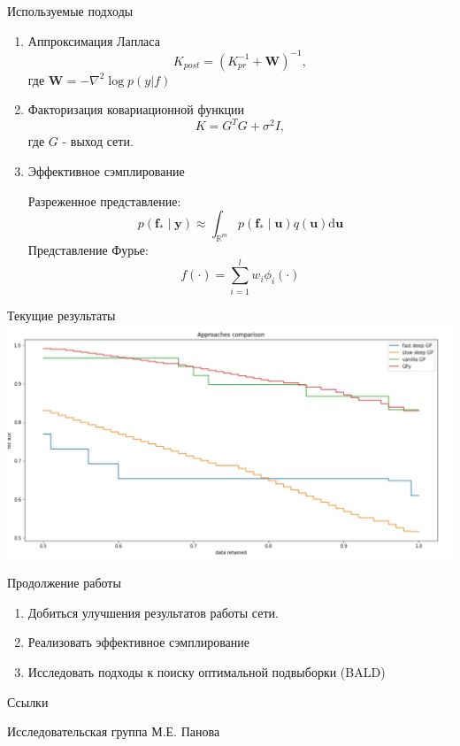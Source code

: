 \documentclass[9pt,pdf,hyperref={unicode}]{beamer}
\begin{document}
\begin{frame}{Используемые подходы}
\begin{enumerate}
    \item Аппроксимация Лапласа
    $$K_{post} = (K_{pr}^{-1} + \mathbf{W})^{-1},$$
    где $\mathbf{W} = -\nabla^2 \log p(y|f)$
    \item Факторизация ковариационной функции
    $$K = G^TG + \sigma^2 I,$$
    где $G$ - выход сети.
    \item Эффективное сэмплирование
    
    Разреженное представление:
    $$
p\left(\boldsymbol{f}_{*} \mid \boldsymbol{y}\right) \approx \int_{\mathbb{R}^{m}} p\left(\boldsymbol{f}_{*} \mid \boldsymbol{u}\right) q(\boldsymbol{u}) \mathrm{d} \boldsymbol{u}
$$
    Представление Фурье:
    $$
f(\cdot)=\sum_{i=1}^{l} w_{i} \phi_{i}(\cdot)
$$ 
\end{enumerate}
\end{frame}


\begin{frame}{Текущие результаты}
\includegraphics{roc_auc.jpg}
\end{frame}


\begin{frame}{Продолжение работы}
\begin{enumerate}
    \item
	Добиться улучшения результатов работы сети.
	\item 
	Реализовать эффективное сэмплирование
	\item
	Исследовать подходы к поиску оптимальной подвыборки (BALD)
\end{enumerate}
\end{frame}

\begin{frame}{Ссылки}
\begin{block}
Исследовательская группа М.Е. Панова
\end{block}
\end{frame}
\end{document}
